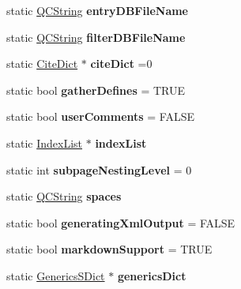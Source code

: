 \begin{DoxyCompactItemize}
\item 
\mbox{\label{class_doxygen_a29ccd68397b81e581a060397f0c2a220}} 
static \mbox{\hyperlink{class_q_c_string}{Q\+C\+String}} {\bfseries entry\+D\+B\+File\+Name}
\item 
\mbox{\label{class_doxygen_ab044e0b3e178d1ba542e38a9c206d57a}} 
static \mbox{\hyperlink{class_q_c_string}{Q\+C\+String}} {\bfseries filter\+D\+B\+File\+Name}
\item 
\mbox{\label{class_doxygen_acd0346761dcfd739ea0722d6451d436b}} 
static \mbox{\hyperlink{class_cite_dict}{Cite\+Dict}} $\ast$ {\bfseries cite\+Dict} =0
\item 
\mbox{\label{class_doxygen_a8963844c275524bcf2b1fb184bfe786d}} 
static bool {\bfseries gather\+Defines} = T\+R\+UE
\item 
\mbox{\label{class_doxygen_aa3fdcd31e3aed249e9f27d76dd11d12e}} 
static bool {\bfseries user\+Comments} = F\+A\+L\+SE
\item 
\mbox{\label{class_doxygen_a91aa9805ef52783816d9da5e457b8cfb}} 
static \mbox{\hyperlink{class_index_list}{Index\+List}} $\ast$ {\bfseries index\+List}
\item 
\mbox{\label{class_doxygen_a6a2eb84be879cca04e934c86d7b0cd94}} 
static int {\bfseries subpage\+Nesting\+Level} = 0
\item 
\mbox{\label{class_doxygen_a89b66309f30c63ea1a7b5d5d17bf12bf}} 
static \mbox{\hyperlink{class_q_c_string}{Q\+C\+String}} {\bfseries spaces}
\item 
\mbox{\label{class_doxygen_ac07e39c40aff392de965adff59f779ff}} 
static bool {\bfseries generating\+Xml\+Output} = F\+A\+L\+SE
\item 
\mbox{\label{class_doxygen_af9c005860944572c032482c0c9b7a172}} 
static bool {\bfseries markdown\+Support} = T\+R\+UE
\item 
\mbox{\label{class_doxygen_aded2bc2f334b1446d014ca0c0814ba00}} 
static \mbox{\hyperlink{class_generics_s_dict}{Generics\+S\+Dict}} $\ast$ {\bfseries generics\+Dict}
\end{DoxyCompactItemize}


